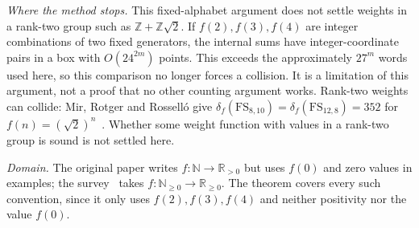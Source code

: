 \documentclass[11pt]{amsart}
\theoremstyle{remark}
\begin{document}
\emph{Where the method stops.} This fixed-alphabet argument does not settle weights in a rank-two group such as $\mathbb Z+\mathbb Z\sqrt2$. If $f(2),f(3),f(4)$ are integer combinations of two fixed generators, the internal sums have integer-coordinate pairs in a box with $O(24^{2m})$ points. This exceeds the approximately $27^m$ words used here, so this comparison no longer forces a collision. It is a limitation of this argument, not a proof that no other counting argument works. Rank-two weights can collide: Mir, Rotger and Rossell\'o give $\delta_f(\mathrm{FS}_{8,10})=\delta_f(\mathrm{FS}_{12,8})=352$ for $f(n)=(\sqrt2)^n$~\cite{MRR2018}. Whether some weight function with values in a rank-two group is sound is not settled here.

\emph{Domain.} The original paper writes $f\colon\mathbb N\to\mathbb R_{>0}$ but uses $f(0)$ and zero values in examples; the survey~\cite{FHKKW2023} takes $f\colon\mathbb N_{\ge0}\to\mathbb R_{\ge0}$. The theorem covers every such convention, since it only uses $f(2),f(3),f(4)$ and neither positivity nor the value $f(0)$.



\end{document}

